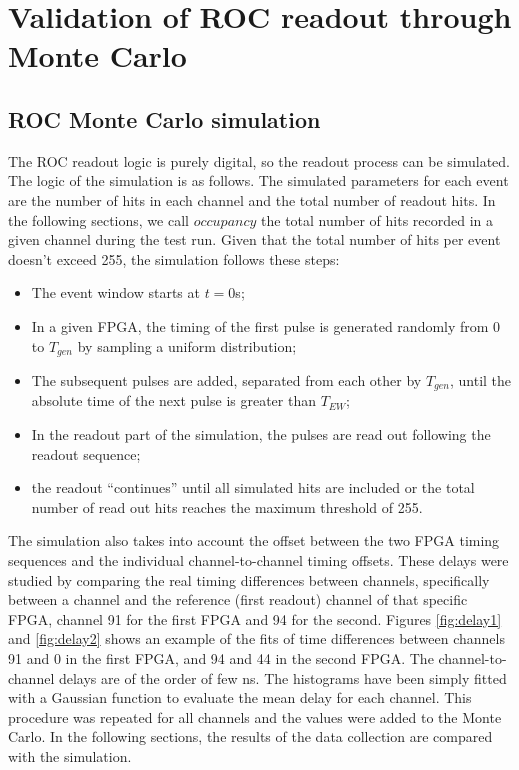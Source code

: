 \section{Validation of ROC readout through Monte Carlo}
\subsection{ROC Monte Carlo simulation}\label{MonteCarlo}
 
The ROC readout logic is purely digital, so the readout process can be simulated. 
The logic of the simulation is as follows. The simulated parameters for each event are the number of hits in each channel
and the total number of readout hits. In the following sections, we call $occupancy$ the total number of hits
recorded in a given channel during the test run. Given that the total number of hits per event doesn't exceed 255, the simulation follows these steps:
\begin{itemize}
\item
  The event window starts at $t=0$s;
\item
  In a given FPGA, the timing of the first pulse is generated randomly from 0 to $T_{gen}$
  by sampling a uniform distribution;
\item
  The subsequent pulses are added, separated from each other by $T_{gen}$,
  until the absolute time
  of the next pulse is greater than $T_{EW}$;
\item
  In the readout part of the simulation, the pulses are read out following the readout sequence;
\item
  the readout ``continues'' until all simulated hits are included or
  the total number of read out hits reaches the maximum threshold of 255. 
\end{itemize}

The simulation also takes into account the offset between the two FPGA timing sequences and the 
individual channel-to-channel timing offsets. These delays were studied by comparing the real timing 
differences between channels, specifically between a channel and the reference (first readout) channel of that 
specific FPGA, channel 91 for the first FPGA and 94 for the second. Figures \ref{fig:delay1} and \ref{fig:delay2} 
shows an example of the fits of time differences between channels 91 and 0 in the first FPGA, and 94 and 44 in the second FPGA. 
The channel-to-channel delays are of the order of few ns. The histograms have been simply fitted with a Gaussian function 
to evaluate the mean delay for each channel. This procedure was repeated for all channels and the values were added to the Monte Carlo.
In the following sections, the results of the data collection are compared with the simulation.

